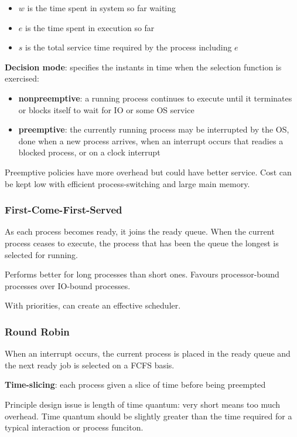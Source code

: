 \documentclass[11pt]{article}
\begin{document}
\begin{itemize}
\item \(w\) is the time spent in system so far waiting
\item \(e\) is the time spent in execution so far
\item \(s\) is the total service time required by the process including \(e\)
\end{itemize}

\textbf{Decision mode}: specifies the instants in time when the selection function is exercised:
\begin{itemize}
\item \textbf{nonpreemptive}: a running process continues to execute until it terminates or blocks
itself to wait for IO or some OS service
\item \textbf{preemptive}: the currently running process may be interrupted by the OS, done when a
new process arrives, when an interrupt occurs that readies a blocked process, or
on a clock interrupt
\end{itemize}

Preemptive policies have more overhead but could have better service.
Cost can be kept low with efficient process-switching and large main memory.
\subsubsection{First-Come-First-Served}
\label{sec:orgcdfdf07}
As each process becomes ready, it joins the ready queue.
When the current process ceases to execute, the process that has been the queue the
longest is selected for running.

Performs better for long processes than short ones.
Favours processor-bound processes over IO-bound processes.

With priorities, can create an effective scheduler.
\subsubsection{Round Robin}
\label{sec:org4d7a2ac}
When an interrupt occurs, the current process is placed in the ready queue and the
next ready job is selected on a FCFS basis.

\textbf{Time-slicing}: each process given a slice of time before being preempted

Principle design issue is length of time quantum: very short means too much overhead.
Time quantum should be slightly greater than the time required for a typical
interaction or process funciton.
\end{document}
